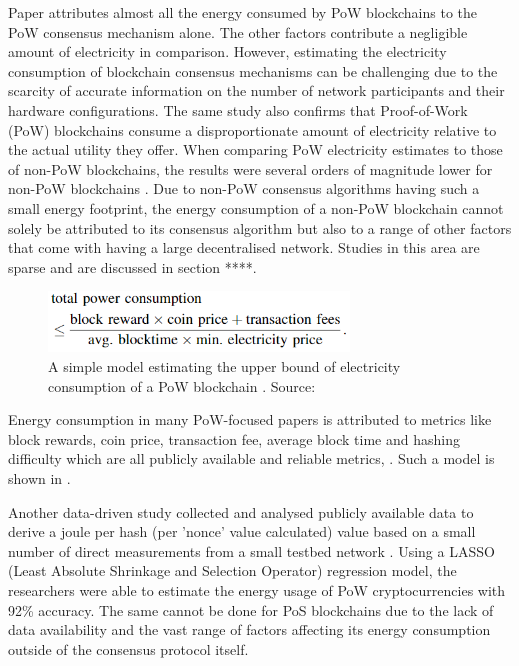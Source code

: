 Paper \cite{Sedlmeir2020TheMyth} attributes almost all the energy consumed by PoW blockchains to the PoW consensus mechanism alone. The other factors contribute a negligible amount of electricity in comparison. However, estimating the electricity consumption of blockchain consensus mechanisms can be challenging due to the scarcity of accurate information on the number of network participants and their hardware configurations. The same study also confirms that Proof-of-Work (PoW) blockchains consume a disproportionate amount of electricity relative to the actual utility they offer. When comparing PoW electricity estimates to those of non-PoW blockchains, the results were several orders of magnitude lower for non-PoW blockchains \cite{Sedlmeir2020TheMyth}. Due to non-PoW consensus algorithms having such a small energy footprint, the energy consumption of a non-PoW blockchain cannot solely be attributed to its consensus algorithm but also to a range of other factors that come with having a large decentralised network. Studies in this area are sparse and are discussed in section ****. 

\begin{figure}[h]
    \centering
    \includegraphics[width=8cm,center]{Figures/SimplePoWModel.png}
    \caption{A simple model estimating the upper bound of electricity consumption of a PoW blockchain . Source: \cite{Sedlmeir2020TheMyth} }
    \label{Figure:SimplePoWModel}
\end{figure}

Energy consumption in many PoW-focused papers is attributed to metrics like block rewards, coin price, transaction fee, average block time and hashing difficulty which are all publicly available and reliable metrics, \cite{Mcdonald2022EthereumEstimate}. Such a model is shown in .

Another data-driven study collected and analysed publicly available data to derive a joule per hash (per 'nonce' value calculated) value based on a small number of direct measurements from a small testbed network \cite{Cole2018ModelingAlgorithms}. Using a LASSO (Least Absolute Shrinkage and Selection Operator) regression model, the researchers were able to estimate the energy usage of PoW cryptocurrencies with 92\% accuracy. The same cannot be done for PoS blockchains due to the lack of data availability and the vast range of factors affecting its energy consumption outside of the consensus protocol itself.

